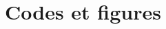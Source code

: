 \documentclass[10pt,a4paper,twoside, twocolumn]{report}
\newcommand*{\rootPath}{}
\begin{document}
\chapter{Codes et figures}






\clearpage
{}



 \listoffigures

\clearpage
\begingroup
	\let\clearpage\relax
	\onecolumn
	 \listoftables
	 \listofalgorithms
	 \listofcode
\endgroup


\end{document}
